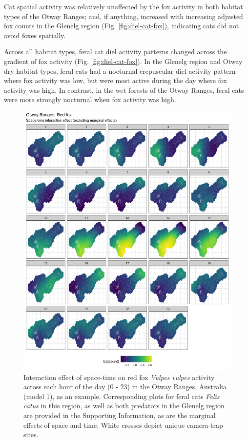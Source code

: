 \documentclass[]{elsarticle} %
\begin{document}
Cat spatial activity was relatively unaffected by the fox activity in both habitat types of the Otway Ranges; and, if anything, increased with increasing adjusted fox counts in the Glenelg region (Fig. \ref{fig:diel-cat-fox}), indicating cats did not avoid foxes spatially.

Across all habitat types, feral cat diel activity patterns changed across the gradient of fox activity (Fig. \ref{fig:diel-cat-fox}). In the Glenelg region and Otway dry habitat types, feral cats had a nocturnal-crepuscular diel activity pattern where fox activity was low, but were most active during the day where fox activity was high. In contrast, in the wet forests of the Otway Ranges, feral cats were more strongly nocturnal when fox activity was high.

\newpage

\begin{figure}

{\centering \includegraphics[width=1\linewidth]{../figs/spte_diff_avg_o_fox} 

}

\caption{Interaction effect of space-time on red fox \textit{Vulpes vulpes} activity across each hour of the day (0 - 23) in the Otway Ranges, Australia (model 1), as an example. Corresponding plots for feral cats \textit{Felis catus} in this region, as well as both predators in the Glenelg region are provided in the Supporting Information, as are the marginal effects of space and time. White crosses depict unique camera-trap sites.}\label{fig:diel-st-int-o-fox}
\end{figure}
\end{document}
